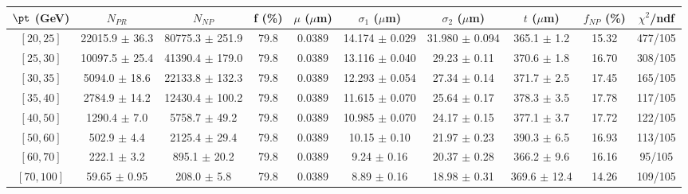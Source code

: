 \begin{tabular}{c||c|c|c|c|c|c|c||c|c}
$\pt$ (GeV) & $N_{PR}$ & $N_{NP}$ & f (\%) & $\mu$ ($\mu$m) & $\sigma_1$ ($\mu$m) & $\sigma_2$ ($\mu$m)  & $t$ ($\mu$m) & $f_{NP}$ (\%) & $\chi^2$/ndf \\
\hline
$[20, 25]$ & 22015.9 $\pm$ 36.3 & 80775.3 $\pm$ 251.9 & 79.8 & 0.0389 & 14.174 $\pm$ 0.029 & 31.980 $\pm$ 0.094 & 365.1 $\pm$ 1.2 & 15.32 & 477/105\\
$[25, 30]$ & 10097.5 $\pm$ 25.4 & 41390.4 $\pm$ 179.0 & 79.8 & 0.0389 & 13.116 $\pm$ 0.040 & 29.23 $\pm$ 0.11 & 370.6 $\pm$ 1.8 & 16.70 & 308/105\\
$[30, 35]$ & 5094.0 $\pm$ 18.6 & 22133.8 $\pm$ 132.3 & 79.8 & 0.0389 & 12.293 $\pm$ 0.054 & 27.34 $\pm$ 0.14 & 371.7 $\pm$ 2.5 & 17.45 & 165/105\\
$[35, 40]$ & 2784.9 $\pm$ 14.2 & 12430.4 $\pm$ 100.2 & 79.8 & 0.0389 & 11.615 $\pm$ 0.070 & 25.64 $\pm$ 0.17 & 378.3 $\pm$ 3.5 & 17.78 & 117/105\\
$[40, 50]$ & 1290.4 $\pm$ 7.0 & 5758.7 $\pm$ 49.2 & 79.8 & 0.0389 & 10.985 $\pm$ 0.070 & 24.17 $\pm$ 0.15 & 377.1 $\pm$ 3.7 & 17.72 & 122/105\\
$[50, 60]$ & 502.9 $\pm$ 4.4 & 2125.4 $\pm$ 29.4 & 79.8 & 0.0389 & 10.15 $\pm$ 0.10 & 21.97 $\pm$ 0.23 & 390.3 $\pm$ 6.5 & 16.93 & 113/105\\
$[60, 70]$ & 222.1 $\pm$ 3.2 & 895.1 $\pm$ 20.2 & 79.8 & 0.0389 & 9.24 $\pm$ 0.16 & 20.37 $\pm$ 0.28 & 366.2 $\pm$ 9.6 & 16.16 & 95/105\\
$[70, 100]$ & 59.65 $\pm$ 0.95 & 208.0 $\pm$ 5.8 & 79.8 & 0.0389 & 8.89 $\pm$ 0.16 & 18.98 $\pm$ 0.31 & 369.6 $\pm$ 12.4 & 14.26 & 109/105\\
\end{tabular}
